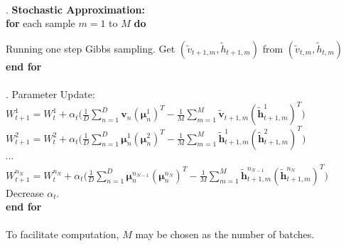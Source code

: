 \documentclass[12pt]{article}
\begin{document}
\\
. \textbf{Stochastic Approximation:}\\
\indent \textbf{for} each sample $m=1$ to $M$ \textbf{do}\par
\indent\indent Running one step Gibbs sampling. Get $(\tilde{v}_{t+1,m},\tilde{h}_{t+1,m})$ from $(\tilde{v}_{t,m},\tilde{h}_{t,m})$\\
\textbf{end for}\\
\\
. Parameter Update:\\
\indent $W^1_{t+1} = W^1_t + \alpha_t\Big(\frac{1}{D}\sum_{n=1}^D \mathbf{v}_n(\mathbold{\mu}_n^1)^T- \frac{1}{M}\sum_{m=1}^M \tilde{\mathbf{v}}_{t+1,m}(\tilde{\mathbf{h}}_{t+1,m}^1)^T\Big)$\\
\indent $W^2_{t+1} = W^2_t + \alpha_t\Big(\frac{1}{D}\sum_{n=1}^D \mathbold{\mu}_n^1(\mathbold{\mu}_n^2)^T- \frac{1}{M}\sum_{m=1}^M \tilde{\mathbf{h}}_{t+1,m}^1(\tilde{\mathbf{h}}_{t+1,m}^2)^T\Big)$\\
\indent$\cdots$ \\
\indent $W^{n_N}_{t+1} = W^{n_N}_t + \alpha_t\Big(\frac{1}{D}\sum_{n=1}^D \mathbold{\mu}_n^{n_{N-1}}(\mathbold{\mu}_n^{n_N})^T- \frac{1}{M}\sum_{m=1}^M \tilde{\mathbf{h}}_{t+1,m}^{n_{N-1}}(\tilde{\mathbf{h}}_{t+1,m}^{n_N})^T\Big)$\\
\indent Decrease $\alpha_t$.\\
\noindent \textbf{end for}\\
\\
To facilitate computation, $M$ may be chosen as the number of batches.\\
\end{document}
